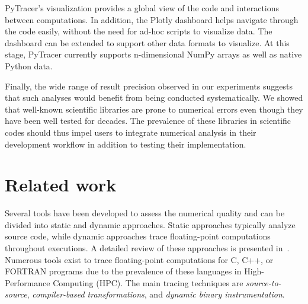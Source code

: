 \documentclass[10pt,journal,compsoc]{IEEEtran}
\newcommand{\pytracer}[0]{PyTracer\xspace}
\DeclareRobustCommand{\remove}[1]{}
\DeclareRobustCommand{\remove}[1]{}
\begin{document}
\pytracer's visualization provides a global view of the code and interactions between
computations. In addition, the Plotly dashboard helps navigate through the code
easily, without the need for ad-hoc scripts to visualize data. The
dashboard can be extended to support other data formats to visualize. At this
stage, \pytracer currently supports n-dimensional NumPy arrays as well as native
Python data. 

\remove{
    As we showed in Section~\ref{sec:impact_mca_modes}, using Full MCA mode leads to
    runtime errors that have a considerable impact on the proper functioning of the
    execution, which is unfortunate since these errors do not reflect actual
    numerical errors but are related to perturbations that should not occur.
    Conversely, RR mode is far more conservative since it preserves exact operations
    and is easier to use even though it does not simulate all perturbations.
    Therefore, from our experiments, we recommend the use of RR over Full MCA. More
    research is required to address the issues encountered with Full MCA. 
}


Finally, the wide range of result precision observed in our experiments
suggests that such
analyses would benefit from being conducted systematically. We showed that
well-known scientific libraries are prone to numerical errors even though they
have been well tested for decades. The prevalence of these libraries in
scientific codes should thus impel users to integrate numerical analysis in
their development workflow in addition to testing their implementation.

\section{Related work}

Several tools have been developed to assess the numerical quality and can be
divided into static and dynamic approaches. Static approaches typically analyze
source code, while dynamic approaches trace floating-point computations
throughout executions. A detailed review of these approaches is presented
in~\cite{cherubin2020tools}. 
Numerous tools exist to trace floating-point computations for C, C++, or
FORTRAN programs due to the prevalence of these languages in High-Performance
Computing (HPC). The main tracing techniques are \textit{source-to-source},
\textit{compiler-based transformations}, and \textit{dynamic binary
    instrumentation}.
\end{document}

